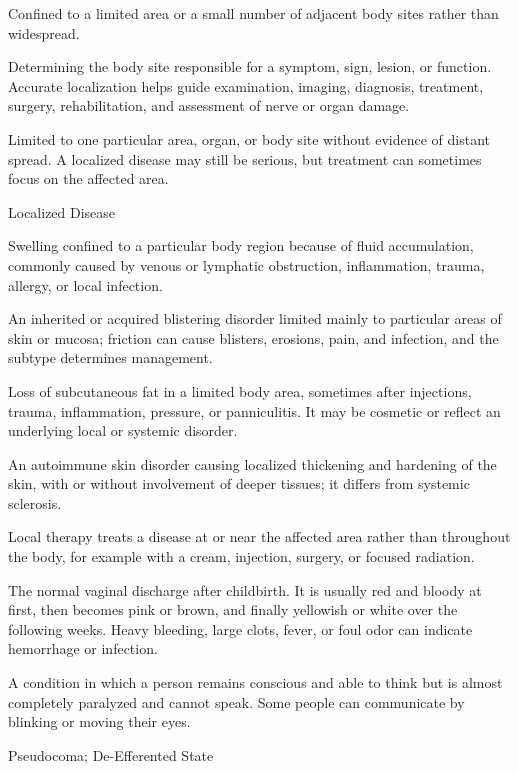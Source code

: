  Confined to a limited area or a small number of adjacent body sites rather than widespread.

 Determining the body site responsible for a symptom, sign, lesion, or function. Accurate localization helps guide examination, imaging, diagnosis, treatment, surgery, rehabilitation, and assessment of nerve or organ damage.

 Limited to one particular area, organ, or body site without evidence of distant spread. A localized disease may still be serious, but treatment can sometimes focus on the affected area.

\synonyms
Localized Disease

 Swelling confined to a particular body region because of fluid accumulation, commonly caused by venous or lymphatic obstruction, inflammation, trauma, allergy, or local infection.

 An inherited or acquired blistering disorder limited mainly to particular areas of skin or mucosa; friction can cause blisters, erosions, pain, and infection, and the subtype determines management.

 Loss of subcutaneous fat in a limited body area, sometimes after injections, trauma, inflammation, pressure, or panniculitis. It may be cosmetic or reflect an underlying local or systemic disorder.

 An autoimmune skin disorder causing localized thickening and hardening of the skin, with or without involvement of deeper tissues; it differs from systemic sclerosis.

 Local therapy treats a disease at or near the affected area rather than throughout the body, for example with a cream, injection, surgery, or focused radiation.

 The normal vaginal discharge after childbirth. It is usually red and bloody at first, then becomes pink or brown, and finally yellowish or white over the following weeks. Heavy bleeding, large clots, fever, or foul odor can indicate hemorrhage or infection.

 A condition in which a person remains conscious and able to think but is almost completely paralyzed and cannot speak. Some people can communicate by blinking or moving their eyes.

\synonyms
Pseudocoma; De-Efferented State

